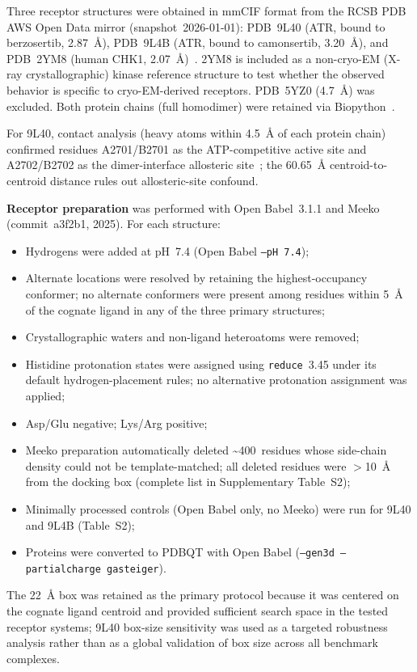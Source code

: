 \documentclass[global,twocolumn]{svjour}
\begin{document}
Three receptor structures were obtained in mmCIF format from the RCSB PDB AWS
Open Data mirror (snapshot~2026-01-01): PDB~9L40 (ATR, bound to berzosertib,
2.87~\AA{}), PDB~9L4B (ATR, bound to camonsertib, 3.20~\AA{}), and PDB~2YM8
(human CHK1, 2.07~\AA{})~\cite{wang2025}. 2YM8 is included as a non-cryo-EM
(X-ray crystallographic) kinase reference structure to test whether the
observed behavior is specific to cryo-EM-derived receptors. PDB~5YZ0
(4.7~\AA{}) was excluded. Both protein chains (full homodimer) were retained
via Biopython~\cite{cock2009}.

For 9L40, contact analysis (heavy atoms within 4.5~\AA{} of each protein
chain) confirmed residues A2701/B2701 as the ATP-competitive active site and
A2702/B2702 as the dimer-interface allosteric site~\cite{wang2025}; the
60.65~\AA{} centroid-to-centroid distance rules out allosteric-site confound.

\textbf{Receptor preparation} was performed with Open Babel~3.1.1 and Meeko
(commit~a3f2b1, 2025). For each structure:
\begin{itemize}\sloppy
\item Hydrogens were added at pH~7.4 (Open Babel \texttt{--pH 7.4});
\item Alternate locations were resolved by retaining the highest-occupancy
  conformer; no alternate conformers were present among residues within
  5~\AA{} of the cognate ligand in any of the three primary structures;
\item Crystallographic waters and non-ligand heteroatoms were removed;
\item Histidine protonation states were assigned using \texttt{reduce}~3.45
  under its default hydrogen-placement rules; no alternative protonation
  assignment was applied;
\item Asp/Glu negative; Lys/Arg positive;
\item Meeko preparation automatically deleted \textasciitilde400~residues whose
  side-chain density could not be template-matched; all deleted residues were
  $>$10~\AA{} from the docking box (complete list in Supplementary Table~S2);
\item Minimally processed controls (Open Babel only, no Meeko) were run
  for 9L40 and 9L4B (Table~S2);
\item Proteins were converted to PDBQT with Open Babel
  (\texttt{--gen3d --partialcharge gasteiger}).
\end{itemize}

The 22~\AA{} box was retained as the primary protocol because it was centered
on the cognate ligand centroid and provided sufficient search space in the
tested receptor systems; 9L40 box-size sensitivity was used as a targeted
robustness analysis rather than as a global validation of box size across all
benchmark complexes.
\end{document}
